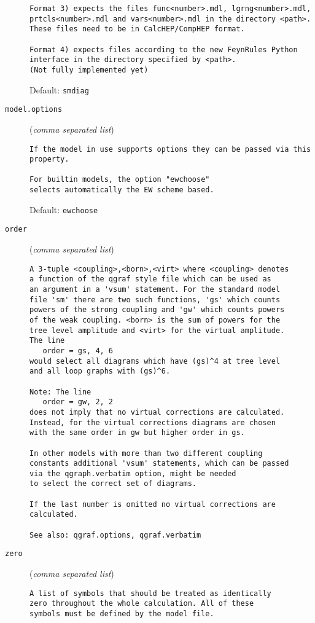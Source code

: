 \begin{description}
\begin{verbatim}
Format 3) expects the files func<number>.mdl, lgrng<number>.mdl,
prtcls<number>.mdl and vars<number>.mdl in the directory <path>.
These files need to be in CalcHEP/CompHEP format.

Format 4) expects files according to the new FeynRules Python
interface in the directory specified by <path>.
(Not fully implemented yet)
\end{verbatim}
Default: \verb|smdiag|
\item[\texttt{model.options}] (\textit{comma separated list})
\begin{verbatim}
If the model in use supports options they can be passed via this
property.

For builtin models, the option "ewchoose"
selects automatically the EW scheme based.
\end{verbatim}
Default: \verb|ewchoose|
\item[\texttt{order}] (\textit{comma separated list})
\begin{verbatim}
A 3-tuple <coupling>,<born>,<virt> where <coupling> denotes
a function of the qgraf style file which can be used as
an argument in a 'vsum' statement. For the standard model
file 'sm' there are two such functions, 'gs' which counts
powers of the strong coupling and 'gw' which counts powers
of the weak coupling. <born> is the sum of powers for the
tree level amplitude and <virt> for the virtual amplitude.
The line
   order = gs, 4, 6
would select all diagrams which have (gs)^4 at tree level
and all loop graphs with (gs)^6.

Note: The line
   order = gw, 2, 2
does not imply that no virtual corrections are calculated.
Instead, for the virtual corrections diagrams are chosen
with the same order in gw but higher order in gs.

In other models with more than two different coupling
constants additional 'vsum' statements, which can be passed
via the qgraph.verbatim option, might be needed
to select the correct set of diagrams.

If the last number is omitted no virtual corrections are
calculated.

See also: qgraf.options, qgraf.verbatim
\end{verbatim}
\item[\texttt{zero}] (\textit{comma separated list})
\begin{verbatim}
A list of symbols that should be treated as identically
zero throughout the whole calculation. All of these
symbols must be defined by the model file.


\end{verbatim}
\end{description}
